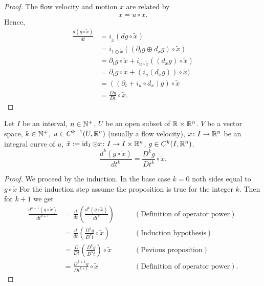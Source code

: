 \begin{proof}
  The flow velocity and motion $x$ are related by
  \begin{equation}
    \dot{x} = u \circ x.
  \end{equation}
  Hence,
  \begin{equation}
    \begin{split}
      \frac{d (g \circ \tilde{x})}{d t}
      & = i_{\dot{\tilde{x}}}(d g \circ \tilde{x}) \\
      & = i_{1 \oplus \dot{x}}((\partial_t g \oplus d_x g) \circ \tilde{x}) \\
      & = \partial_t g \circ \tilde{x}
        + i_{u \circ \tilde{x}} ((d_x g) \circ \tilde{x}) \\
      & = \partial_t g \circ \tilde{x} + (i_u(d_x g)) \circ \tilde{x}) \\
      & = ((\partial_t + i_u \circ d_x) g) \circ \tilde{x} \\
      & = \frac{D g}{D t} \circ \tilde{x}.
    \end{split}
  \end{equation}
\end{proof}
\begin{corollary}
  Let
    $I$ be an interval,
    $n \in \mathbb{N}^+$,
    $U$ be an open subset of $\mathbb{R} \times \mathbb{R}^n$.
    $V$ be a vector space,
    $k \in \mathbb{N}^+$,
    $u \in C^{k - 1}(U, \mathbb{R}^n)$ (usually a flow velocity),
    $x \colon I \to \mathbb{R}^n$ be an integral curve of $u$,
    $\tilde{x} := \mathop{\rm id}\nolimits_I \odot x \colon I \to I \times \mathbb{R}^n$,
    $g \in C^k(I, \mathbb{R}^n)$.
  \begin{equation}
    \frac{d^k (g \circ \tilde{x})}{d t^k} = \frac{D^k g}{D t^k} \circ \tilde{x}.
  \end{equation}
\end{corollary}
\begin{proof}
  We proceed by the induction.
  In the base case $k = 0$ noth sides equal to $g \circ \tilde{x}$
  For the induction step assume the proposition is true for the integer $k$.
  Then for $k + 1$ we get
  \begin{equation}
    \begin{split}
      \frac{d^{k + 1} (g \circ \tilde{x})}{d t^{k + 1}}
      & = \frac{d}{d t}\left(\frac{d^k (g \circ \tilde{x})}{d t^k}\right)
      & \qquad (\text{Definition of operator power}) \\
      & = \frac{d}{d t}\left(\frac{D^k g}{D^k t} \circ \tilde{x}\right)
      & \qquad (\text{Induction hypothesis}) \\
      & = \frac{D}{D t}\left(\frac{D^k g}{D^k t}\right) \circ \tilde{x}
      & \qquad (\text{Pevious proposition}) \\
      & = \frac{D^{k + 1} g}{D t^{k + 1}} \circ \tilde{x}
      & \qquad (\text{Definition of operator power}).
    \end{split}
  \end{equation}
\end{proof}
